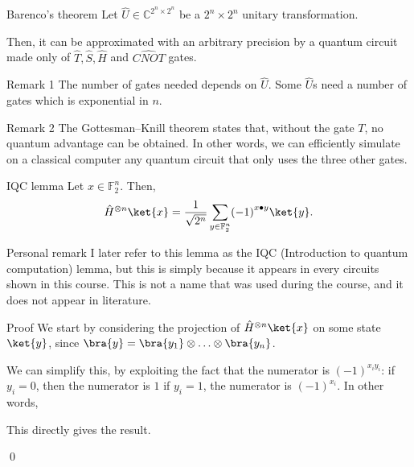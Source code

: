 \documentclass[a4paper]{article}
\begin{document}
\begin{parag}{Barenco's theorem}
    Let $\hat{U} \in \mathbb{C}^{2^n \times 2^n}$ be a $2^n \times 2^n$ unitary transformation.

    Then, it can be approximated with an arbitrary precision by a quantum circuit made only of $\hat{T}, \hat{S}, \hat{H}$ and $\widehat{CNOT}$ gates.

    \begin{subparag}{Remark 1}
        The number of gates needed depends on $\hat{U}$. Some $\hat{U}$s need a number of gates which is exponential in $n$.
    \end{subparag}

    \begin{subparag}{Remark 2}
        The Gottesman–Knill theorem states that, without the gate $T$, no quantum advantage can be obtained. In other words, we can efficiently simulate on a classical computer any quantum circuit that only uses the three other gates.
    \end{subparag}
\end{parag}

\begin{parag}{IQC lemma}
    Let $x \in \mathbb{F}_2^n$. Then,
    \[\hat{H}^{\otimes n} \ket{x} = \frac{1}{\sqrt{2^n}} \sum_{y \in \mathbb{F}_2^n} \left(-1\right)^{x \dotprod y} \ket{y}.\]
    
    \begin{subparag}{Personal remark}
        I later refer to this lemma as the IQC (Introduction to quantum computation) lemma, but this is simply because it appears in every circuits shown in this course. This is not a name that was used during the course, and it does not appear in literature.
    \end{subparag}

    \begin{subparag}{Proof}
        We start by considering the projection of $\hat{H}^{\otimes n} \ket{x}$ on some state $\ket{y}$,
        since $\bra{y} = \bra{y_1} \otimes \ldots \otimes \bra{y_n}$.

        We can simplify this, by exploiting the fact that the numerator is $\left(-1\right)^{x_i y_i}$: if $y_i = 0$, then the numerator is $1$ if $y_i = 1$, the numerator is $\left(-1\right)^{x_i}$. In other words,
        
        This directly gives the result.

        \qed
    \end{subparag}
\end{parag}
\end{document}

